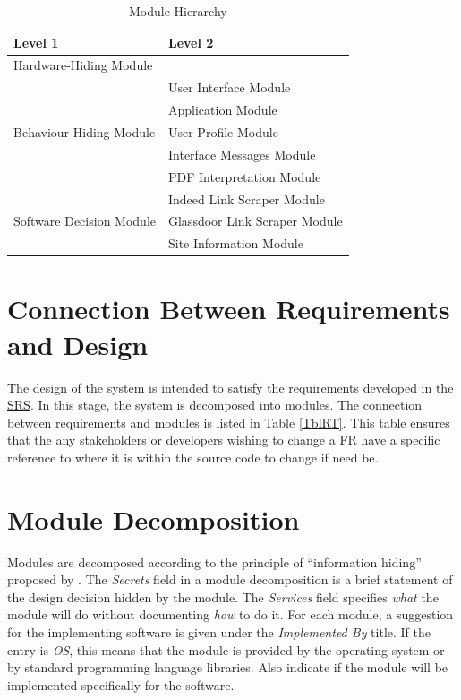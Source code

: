 \documentclass[12pt, titlepage]{article}
\begin{document}
\begin{table}[h!]
\centering
\begin{tabular}{p{} p{}}
\toprule
\textbf{Level 1} & \textbf{Level 2}\\
\midrule

{Hardware-Hiding Module} & ~\\
\midrule

\multirow{5}{0.3\textwidth}[2em]{Behaviour-Hiding Module}
& User Interface Module\\ 
& Application Module\\
& User Profile Module\\
& Interface Messages Module\\
& PDF Interpretation Module\\
\midrule

\multirow{3}{0.3\textwidth}{Software Decision Module}
& Indeed Link Scraper Module\\
& Glassdoor Link Scraper Module\\ 
& Site Information Module\\
\bottomrule

\end{tabular}
\caption{Module Hierarchy}
\label{TblMH}
\end{table}

\FloatBarrier

\section{Connection Between Requirements and Design} \label{SecConnection}

The design of the system is intended to satisfy the requirements developed in
the \href{https://gitlab.cas.mcmaster.ca/jamesong/application_3xa3_l01_grp05/-/blob/main/Doc/SRS}{SRS}. In this stage, the system is decomposed into modules. The connection
between requirements and modules is listed in Table \ref{TblRT}. This table ensures that the any stakeholders or developers wishing to change a FR have a specific reference to where it is within the source code to change if need be.

\section{Module Decomposition} \label{SecMD}

Modules are decomposed according to the principle of ``information hiding''
proposed by \citet{ParnasEtAl1984}. The \emph{Secrets} field in a module
decomposition is a brief statement of the design decision hidden by the
module. The \emph{Services} field specifies \emph{what} the module will do
without documenting \emph{how} to do it. For each module, a suggestion for the
implementing software is given under the \emph{Implemented By} title. If the
entry is \emph{OS}, this means that the module is provided by the operating
system or by standard programming language libraries.  Also indicate if the
module will be implemented specifically for the software.
\end{document}
